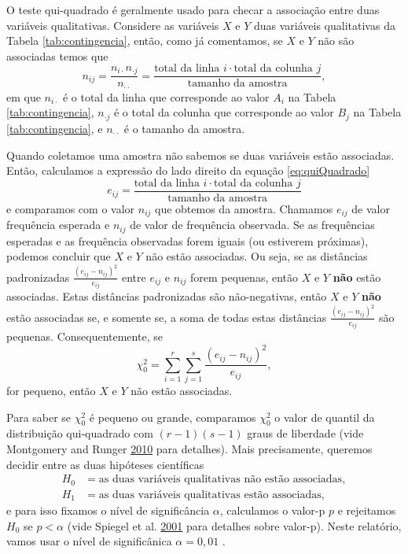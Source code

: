\documentclass[]{article}
\begin{document}
O teste qui-quadrado é geralmente usado para checar a associação entre duas variáveis
qualitativas. Considere as variáveis \(X\) e \(Y\) duas variáveis qualitativas da
Tabela \ref{tab:contingencia}, então, como já comentamos, se \(X\) e \(Y\) não são associadas temos que
\begin{equation}
\label{eq:quiQuadrado}
n_{ij} = \frac{n_{i \cdot } n_{\cdot j}}{n_{\cdot \cdot}} = \frac{\mbox{total da linha }i \cdot \mbox{total da colunha }j}{\mbox{tamanho da amostra}},
\end{equation}
em que \(n_{i \cdot}\) é o total da linha que corresponde ao valor \(A_i\) na Tabela \ref{tab:contingencia}, \(n_{\cdot j}\) é o total da colunha que corresponde ao valor \(B_j\) na Tabela \ref{tab:contingencia}, e \(n_{\cdot \cdot}\) é o tamanho da amostra.

Quando coletamos uma amostra não sabemos se duas variáveis estão associadas. Então, calculamos a expressão do lado direito da equação \eqref{eq:quiQuadrado}
\[
e_{ij} = \frac{\mbox{total da linha }i \cdot \mbox{total da colunha }j}{\mbox{tamanho da amostra}}
\]
e comparamos com o valor \(n_{ij}\) que obtemos da amostra. Chamamos \(e_{ij}\) de valor frequência esperada e \(n_{ij}\) de valor de frequência observada. Se as frequências esperadas e as frequência observadas forem iguais (ou estiverem próximas), podemos concluir que \(X\) e \(Y\) não estão associadas. Ou seja, se as distâncias padronizadas \(\frac{(e_{ij} - n_{ij})^2}{e_{ij}}\) entre \(e_{ij}\) e \(n_{ij}\) forem pequenas, então \(X\) e \(Y\) \textbf{não} estão associadas. Estas distâncias padronizadas são não-negativas, então \(X\) e \(Y\) \textbf{não} estão associadas se, e somente se, a soma de todas estas distâncias \(\frac{(e_{ij} - n_{ij})^2}{e_{ij}}\) são pequenas. Consequentemente, se
\[
\chi_0^2 = \sum_{i=1}^{r} \sum_{j=1}^{s} \frac{(e_{ij} - n_{ij})^2}{e_{ij}},
\]
for pequeno, então \(X\) e \(Y\) não estão associadas.

Para saber se \(\chi_0^2\) é pequeno ou grande, comparamos \(\chi_0^2\) o valor de quantil da distribuição qui-quadrado com \((r-1)(s-1)\) graus de liberdade (vide Montgomery and Runger \protect\hyperlink{ref-montgomery2010applied}{2010} para detalhes). Mais precisamente, queremos decidir entre as duas hipóteses científicas
\begin{align*}
H_0 &= \mbox{as duas variáveis qualitativas não estão associadas},\\
H_1 &= \mbox{as duas variáveis qualitativas estão associadas},
\end{align*}
e para isso fixamos o nível de significância \(\alpha\), calculamos o valor-p \(p\) e rejeitamos \(H_0\) se \(p < \alpha\) (vide Spiegel et al. \protect\hyperlink{ref-spiegel2001probability}{2001} para detalhes sobre valor-p). Neste relatório, vamos usar o nível de significânica \(\alpha=0,01\) .
\end{document}
